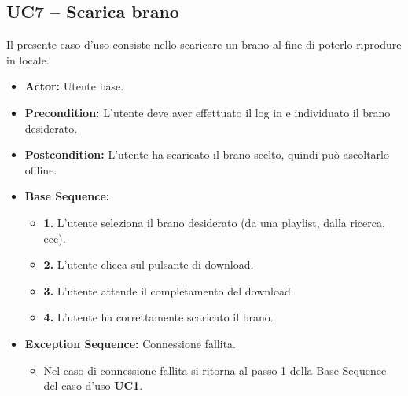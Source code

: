 \subsection{UC7 -- Scarica brano}
Il presente caso d'uso consiste nello scaricare un brano al fine di poterlo riprodure in locale.
\begin{itemize}
    \item \textbf{Actor:} Utente base.
    \item \textbf{Precondition:} L'utente deve aver effettuato il log in e individuato il brano desiderato. 
    \item \textbf{Postcondition:} L'utente ha scaricato il brano scelto, quindi può ascoltarlo offline. 
    \item \textbf{Base Sequence:} 
    \begin{itemize}
        \item \textbf{1.} L'utente seleziona il brano desiderato (da una playlist, dalla ricerca, ecc).
        \item \textbf{2.} L'utente clicca sul pulsante di download.
        \item \textbf{3.} L'utente attende il completamento del download.
        \item \textbf{4.} L'utente ha correttamente scaricato il brano.
    \end{itemize}
    \item \textbf{Exception Sequence:} Connessione fallita.
    \begin{itemize}
        \item Nel caso di connessione fallita si ritorna al passo 1 della Base Sequence del caso d'uso \textbf{UC1}.
    \end{itemize}
\end{itemize}
\vspace{1cm}


